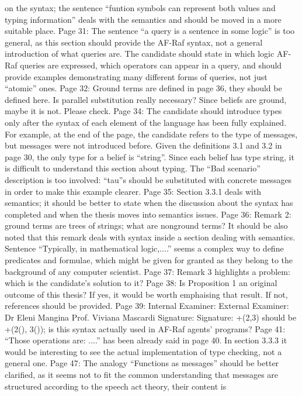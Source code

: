 \documentclass{article}
\newenvironment{them}{\noindent\begingroup\color{blue}}{\endgroup\par}
\begin{document}
\begin{them}
on the syntax; the sentence “funtion symbols can represent both values and typing information”
deals with the semantics and should be moved in a more suitable place.
Page 31:
The sentence “a query is a sentence in some logic” is too general, as this section should provide the
AF-Raf syntax, not a general introduction of what queries are. The candidate should state in which
logic AF-Raf queries are expressed, which operators can appear in a query, and should provide
examples demonstrating many different forms of queries, not just “atomic” ones.
Page 32:
Ground terms are defined in page 36, they should be defined here.
Is parallel substitution really necessary? Since beliefs are ground, maybe it is not. Please check.
Page 34:
The candidate should introduce types only after the syntax of each element of the language has been
fully explained. For example, at the end of the page, the candidate refers to the type of messages,
but messages were not introduced before.
Given the definitions 3.1 and 3.2 in page 30, the only type for a belief is “string”. Since each belief has
type string, it is difficult to understand this section about typing.
The “Bad scenario” description is too involved: “tau”s should be substituted with concrete messages
in order to make this example clearer.
Page 35:
Section 3.3.1 deals with semantics; it should be better to state when the discussion about the syntax
has completed and when the thesis moves into semantics issues.
Page 36:
Remark 2: ground terms are trees of strings; what are nonground terms? It should be also noted that
this remark deals with syntax inside a section dealing with semantics.
Sentence “Typically, in mathematical logic,....” seems a complex way to define predicates and
formulae, which might be given for granted as they belong to the background of any computer
scientist.
Page 37:
Remark 3 highlights a problem: which is the candidate's solution to it?
Page 38:
Is Proposition 1 an original outcome of this thesis? If yes, it would be worth emphaising that result. If
not, references should be provided.
Page 39:
Internal Examiner: External Examiner:
Dr Eleni Mangina Prof. Viviana Mascardi
Signature: Signature:
+(2,3) should be +(2(), 3()); is this syntax actually used in AF-Raf agents' programs?
Page 41:
“Those operations are: ....” has been already said in page 40.
In section 3.3.3 it would be interesting to see the actual implementation of type checking, not a
general one.
Page 47:
The analogy “Functions as messages” should be better clarified, as it seems not to fit the common
understanding that messages are structured according to the speech act theory, their content is

\end{them}
\end{document}
